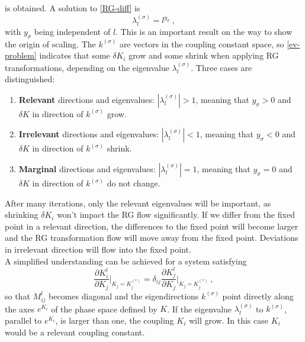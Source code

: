 	is obtained.
	A solution to {\autoref{RG-diff}} is
	\begin{equation} \label{ev-form}
		\lambda_l^{(\sigma)} = l^{y_\sigma}~,
	\end{equation}
	with $y_\sigma$ being independent of $l$. This is an important result on the way to show the origin of scaling. The $k^{(\sigma)}$ are vectors in the coupling constant space, so \autoref{ev-problem} indicates that some $\delta K_i$ grow and some shrink when applying RG transformations, depending on the eigenvalue $\lambda_l^{(\sigma)}$. Three cases are distinguished:
	\begin{enumerate}
		\item \textbf{Relevant} directions and eigenvalues:	$|\lambda_l^{(\sigma)}| > 1$, meaning that $y_\sigma > 0$ and $\delta K$ in direction of $k^{(\sigma)}$ grow.
		\item \textbf{Irrelevant} directions and eigenvalues:	$|\lambda_l^{(\sigma)}| < 1$, meaning that $y_\sigma < 0$ and $\delta K$ in direction of $k^{(\sigma)}$ shrink.
		\item \textbf{Marginal} directions and eigenvalues:	$|\lambda_l^{(\sigma)}| = 1$, meaning that $y_\sigma = 0$ and $\delta K$ in direction of $k^{(\sigma)}$ do not change.
	\end{enumerate}
	After many iterations, only the relevant eigenvalues will be important, as shrinking $\delta K_i$ won't impact the RG flow significantly. If we differ from the fixed point in a relevant direction, the differences to the fixed point will become larger and the RG transformation flow will move away from the fixed point. Deviations in irrelevant direction will flow into the fixed point. \\
	
	A simplified understanding can be achieved for a system satisfying
	\begin{equation}
		\frac{\partial K_i^l}{\partial K_j} \bigg |_{K_j = K_j^{(*)}} = \delta_{ij} \frac{\partial K_j^l}{\partial K_j} \bigg |_{K_j = K_j^{(*)}}~,
	\end{equation}
	so that $M^l_{ij}$ becomes diagonal and the eigendirections $k^{(\sigma)}$ point directly along the axes $e^{K_i}$ of the phase space defined by $K$. If the eigenvalue $\lambda_l^{(\sigma)}$ to $k^{(\sigma)}$, parallel to $e^{K_i}$, is larger than one, the coupling $K_i$ will grow. In this case $K_i$ would be a relevant coupling constant. \\
	
